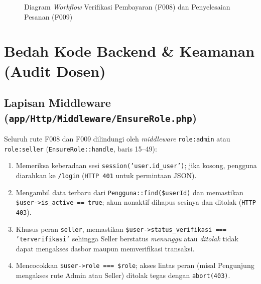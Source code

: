 \documentclass[11pt,a4paper]{article}
\begin{document}
\begin{figure}[htbp]
{%
}
\caption{Diagram \textit{Workflow} Verifikasi Pembayaran (F008) dan Penyelesaian Pesanan (F009)}
\label{fig:wf-f008-f009}
\end{figure}

\section{Bedah Kode Backend \& Keamanan (Audit Dosen)}

\subsection{Lapisan Middleware (\texttt{app/Http/Middleware/EnsureRole.php})}
Seluruh rute F008 dan F009 dilindungi oleh \textit{middleware} \texttt{role:admin} atau \texttt{role:seller} (\texttt{EnsureRole::handle}, baris 15--49):
\begin{enumerate}[leftmargin=1.5em, itemsep=2pt, topsep=2pt]
  \item Memeriksa keberadaan sesi \texttt{session('user.id\_user')}; jika kosong, pengguna diarahkan ke \texttt{/login} (\texttt{HTTP 401} untuk permintaan JSON).
  \item Mengambil data terbaru dari \texttt{Pengguna::find(\$userId)} dan memastikan \texttt{\$user->is\_active == true}; akun nonaktif dihapus sesinya dan ditolak (\texttt{HTTP 403}).
  \item Khusus peran \texttt{seller}, memastikan \texttt{\$user->status\_\allowbreak verifikasi === 'terverifikasi'} sehingga Seller berstatus \textit{menunggu} atau \textit{ditolak} tidak dapat mengakses dasbor maupun memverifikasi transaksi.
  \item Mencocokkan \texttt{\$user->role === \$role}; akses lintas peran (misal Pengunjung mengakses rute Admin atau Seller) ditolak tegas dengan \texttt{abort(403)}.
\end{enumerate}
\end{document}
